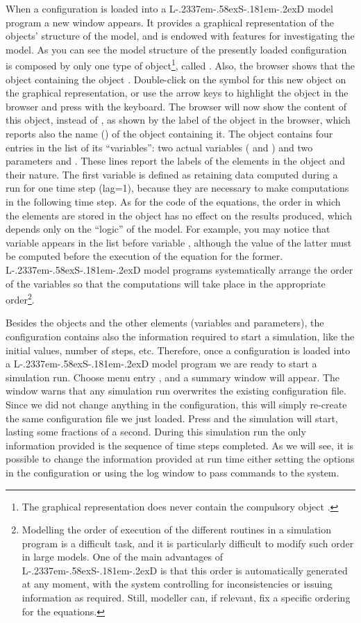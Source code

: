 \documentclass [11pt,a4paper] {book}
\def\LsD{{L\kern-.2337em\lower-.58ex\hbox{S}\kern-.181em\lower-.2ex\hbox{D}}\xspace}
\begin{document}
When a configuration is loaded into a \LsD model program a new window appears. It provides a graphical representation of the objects' structure of the model, and is endowed with features for investigating the model. As you can see the model structure of the presently loaded configuration is composed by only one type of object\footnote{The graphical representation does never contain the compulsory object .}, called . Also, the browser shows that the object  containing the object . Double-click on the symbol for this new object on the graphical representation, or use the arrow keys to highlight the object in the browser and press  with the keyboard. The browser will now show the content of this object, instead of , as shown by the label of the object in the browser, which reports also the name () of the object containing it. The object  contains four entries in the list of its ``variables'': two actual variables ( and ) and two parameters  and . These lines report the labels of the elements in the object and their nature. The first variable is defined as retaining data computed during a run for one time step (lag=1), because they are necessary to make computations in the following time step. As for the code of the equations, the order in which the elements are stored in the object has no effect on the results produced, which depends only on the ``logic'' of the model. For example, you may notice that variable  appears in the list before variable , although the value of the latter must be computed before the execution of the equation for the former. \LsD model programs systematically arrange the order of the variables so that the computations will take place in the appropriate order\footnote{Modelling the order of execution of the different routines in a simulation program is a difficult task, and it is particularly difficult to modify such order in large models. One of the main advantages of \LsD is that this order is automatically generated at any moment, with the system controlling for inconsistencies or issuing information as required. Still, modeller can, if relevant, fix a specific ordering for the equations.}. 

Besides the objects and the other elements (variables and parameters), the configuration contains also the information required to start a simulation, like the initial values, number of steps, etc. Therefore, once a configuration is loaded into a \LsD model program we are ready to start a simulation run. Choose menu entry , and a summary window will appear. The window warns that any simulation run overwrites the existing configuration file. Since we did not change anything in the configuration, this will simply re-create the same configuration file we just loaded. Press  and the simulation will start, lasting some fractions of a second. During this simulation run the only information provided is the sequence of time steps completed. As we will see, it is possible to change the information provided at run time either setting the options in the configuration or using the log window to pass commands to the system. 
\end{document}

